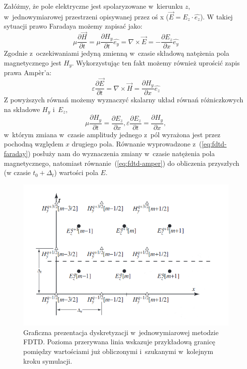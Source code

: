 Załóżmy, że pole elektryczne jest spolaryzowane w~kierunku $z$, w~jednowymiarowej przestrzeni opisywanej przez oś x ($\vec{E}=E_z \cdot \hat{e_z}$). W takiej sytuacji prawo Faradaya możemy zapisać jako:
\begin{equation}
\mu \frac{\partial \vec{H}}{\partial t}= \mu \frac{\partial H_y}{\partial t} \hat{e_y}= \nabla \times \vec{E} = - \frac{\partial E_z}{\partial x} \hat{e_y} 
\label{eq:fdtd-faraday}
\end{equation}
Zgodnie z~oczekiwaniami jedyną zmienną w~czasie składową natężenia pola magnetycznego jest $H_y$. Wykorzystując ten fakt możemy również uprościć zapis prawa Amp\`{e}r'a:
\begin{equation}
\varepsilon \frac{\partial \vec{E}}{\partial t}=\nabla \times \vec{H} = \frac{\partial H_y}{\partial x} \hat{e_z}
\label{eq:fdtd-amper}
\end{equation}
Z powyższych równań możemy wyznaczyć skalarny układ równań różniczkowych na składowe $H_y$ i~$E_z$,
\begin{equation}
\mu \frac{\partial H_y}{\partial t}=\frac{\partial E_z}{\partial x} ,
\varepsilon \frac{\partial E_z}{\partial t}=\frac{\partial H_y}{\partial x},
\end{equation} w~którym zmiana w~czasie amplitudy jednego z~pól wyrażona jest przez pochodną względem $x$ drugiego pola. Równanie wyprowadzone z~(\ref{eq:fdtd-faraday}) posłuży nam do wyznaczenia zmiany w~czasie natężenia pola magnetycznego, natomiast równanie~(\ref{eq:fdtd-amper}) do obliczenia przyszłych (w czasie $t_0 + \Delta_t$) wartości pola $E$.

\begin{figure}[tb]
\includegraphics[width=.9\textwidth]{subart/fdtd/leapfrog.png}
\caption{Graficzna prezentacja dyskretyzacji w~jednowymiarowej metodzie FDTD. Pozioma przerywana linia wskazuje przykładową granicę pomiędzy wartościami już obliczonymi i~szukanymi w~kolejnym kroku symulacji. }
\label{pic:leapfrog}
\end{figure}

